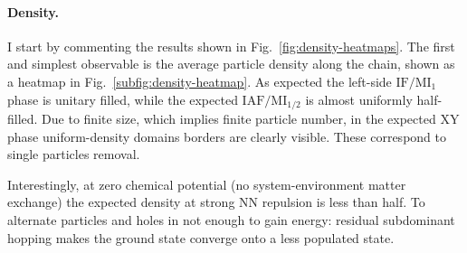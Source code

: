 \paragraph{Density.} I start by commenting the results shown in Fig.~\ref{fig:density-heatmaps}. The first and simplest observable is the average particle density along the chain, shown as a heatmap in Fig.~\ref{subfig:density-heatmap}. As expected the left-side $\mathrm{IF}/\mathrm{MI}_1$ phase is unitary filled, while the expected $\mathrm{IAF}/\mathrm{MI}_{1/2}$ is almost uniformly half-filled. Due to finite size, which implies finite particle number, in the expected $\mathrm{XY}$ phase uniform-density domains borders are clearly visible. These correspond to single particles removal.

Interestingly, at zero chemical potential (no system-environment matter exchange) the expected density at strong NN repulsion is less than half. To alternate particles and holes in not enough to gain energy: residual subdominant hopping makes the ground state converge onto a less populated state.

